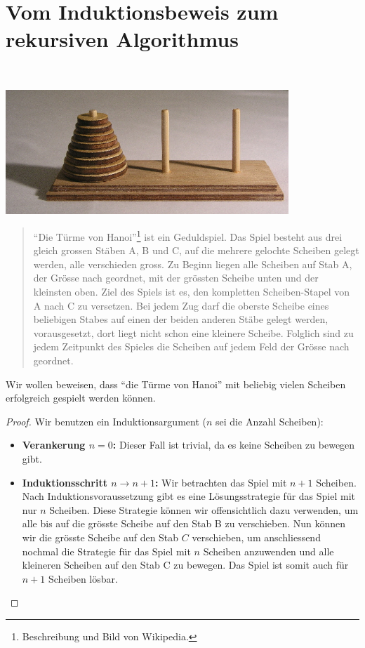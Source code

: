 \section{Vom Induktionsbeweis zum rekursiven Algorithmus}

\begin{bsp}~
\begin{center}
\includegraphics[width=0.8\textwidth]{figures/hanoi}
\end{center}
\begin{quote}
``Die Türme von Hanoi''\footnote{Beschreibung und Bild von Wikipedia.} ist ein Geduldspiel. Das Spiel besteht aus drei gleich grossen Stäben A, B und C, auf die mehrere gelochte Scheiben gelegt werden, alle verschieden gross. Zu Beginn liegen alle Scheiben auf Stab A, der Grösse nach geordnet, mit der grössten Scheibe unten und der kleinsten oben. Ziel des Spiels ist es, den kompletten Scheiben-Stapel von A nach C zu versetzen.
Bei jedem Zug darf die oberste Scheibe eines beliebigen Stabes auf einen der beiden anderen Stäbe gelegt werden, vorausgesetzt, dort liegt nicht schon eine kleinere Scheibe. Folglich sind zu jedem Zeitpunkt des Spieles die Scheiben auf jedem Feld der Grösse nach geordnet.
\end{quote}
Wir wollen beweisen, dass ``die Türme von Hanoi'' mit beliebig vielen Scheiben erfolgreich gespielt werden können.
\begin{proof} Wir benutzen ein Induktionsargument ($n$ sei die Anzahl Scheiben):
\begin{itemize}
\item \textbf{Verankerung $n=0$:} Dieser Fall ist trivial, da es keine Scheiben zu bewegen gibt.
\item \textbf{Induktionsschritt $n\to n+1$:} Wir betrachten das Spiel mit $n+1$ Scheiben. Nach Induktionsvoraussetzung gibt es eine Lösungsstrategie für das Spiel mit nur $n$ Scheiben. Diese Strategie können wir offensichtlich dazu verwenden, um alle bis auf die grösste Scheibe auf den Stab B zu verschieben. Nun können wir die grösste Scheibe auf den Stab $C$ verschieben, um anschliessend nochmal die Strategie für das Spiel mit $n$ Scheiben anzuwenden und alle kleineren Scheiben auf den Stab C zu bewegen. Das Spiel ist somit auch für $n+1$ Scheiben lösbar. \qedhere

\end{itemize}
\end{proof}
\end{bsp}
